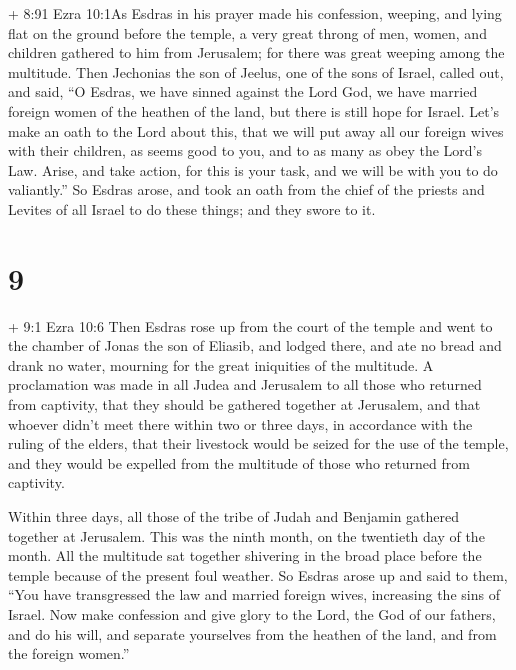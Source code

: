  + 8:91 Ezra 10:1As Esdras in his prayer made his
confession, weeping, and lying flat on the ground before the temple, a
very great throng of men, women, and children gathered to him from
Jerusalem; for there was great weeping among the multitude.
 Then Jechonias the son of Jeelus, one of the sons of
Israel, called out, and said, ``O Esdras, we have sinned against the
Lord God, we have married foreign women of the heathen of the land, but
there is still hope for Israel.  Let's make an oath to the
Lord about this, that we will put away all our foreign wives with their
children,  as seems good to you, and to as many as obey the
Lord's Law.  Arise, and take action, for this is your task,
and we will be with you to do valiantly.''  So Esdras
arose, and took an oath from the chief of the priests and Levites of all
Israel to do these things; and they swore to it.

\hypertarget{section-8}{%
\section{9}\label{section-8}}

 + 9:1 Ezra 10:6 Then Esdras rose up from the court of the
temple and went to the chamber of Jonas the son of Eliasib, 
and lodged there, and ate no bread and drank no water, mourning for the
great iniquities of the multitude.  A proclamation was made
in all Judea and Jerusalem to all those who returned from captivity,
that they should be gathered together at Jerusalem,  and
that whoever didn't meet there within two or three days, in accordance
with the ruling of the elders, that their livestock would be seized for
the use of the temple, and they would be expelled from the multitude of
those who returned from captivity.

 Within three days, all those of the tribe of Judah and
Benjamin gathered together at Jerusalem. This was the ninth month, on
the twentieth day of the month.  All the multitude sat
together shivering in the broad place before the temple because of the
present foul weather.  So Esdras arose up and said to them,
``You have transgressed the law and married foreign wives, increasing
the sins of Israel.  Now make confession and give glory to
the Lord, the God of our fathers,  and do his will, and
separate yourselves from the heathen of the land, and from the foreign
women.''

